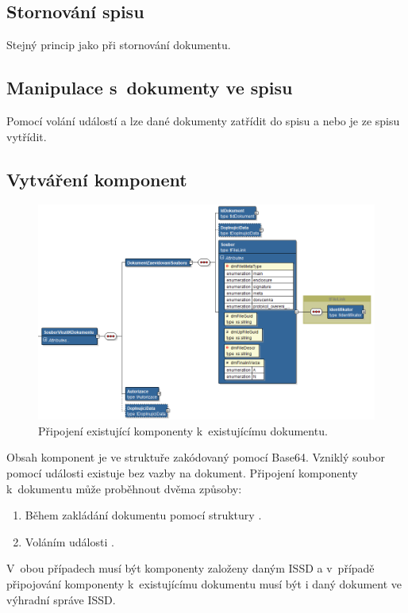 \documentclass[
  master,
  field=ainfp,
  biblatex,
  language=czech,
  glossaries,
  theorems=false,
  index
]{kidiplom}
\begin{document}
\subsection{Stornování spisu}     
Stejný princip jako při stornování dokumentu.

\subsection{Manipulace s~dokumenty ve spisu}
Pomocí volání událostí  a  lze dané dokumenty zatřídit do spisu a nebo je ze spisu vytřídit.

\subsection{Vytváření komponent}
\begin{figure}[h]
  \centerline{\includegraphics[width=0.9\linewidth]{./images/UdalostSouborVlozitKDokumentu.png}} 
  \caption{Připojení existující komponenty k~existujícímu dokumentu.} 
\end{figure} 
Obsah komponent je ve struktuře zakódovaný pomocí Base64. Vzniklý soubor pomocí události  existuje bez vazby na dokument. Připojení komponenty k~dokumentu může proběhnout dvěma způsoby:
\begin{enumerate}
	\item Během zakládání dokumentu pomocí struktury .
	\item Voláním události .
\end{enumerate}
V~obou případech musí být komponenty založeny daným ISSD a v~případě připojování komponenty k~existujícímu dokumentu musí být i daný dokument ve výhradní správe ISSD.
\end{document}
